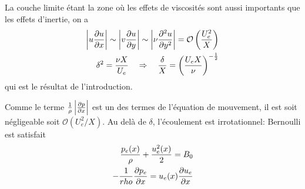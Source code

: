      La couche limite étant la zone où les effets de viscosités sont aussi importants que les effets d'inertie, on a
      \begin{equation}
        \begin{aligned}
          \left|u\pdv{u}{x}\right| \sim \left|v \pdv{u}{y} \right| \sim \left|\nu \pdv[2]{u}{y} \right| = \mathcal{O}\left(\frac{U_e^2}{X}\right)\\
          \delta^2 = \frac{\nu X}{U_e} \quad \Rightarrow \quad \frac{\delta}{X} = \left(\frac{U_e X}{\nu}\right)^{-\frac{1}{2}}
        \end{aligned}
      \end{equation}
      qui est le résultat de l'introduction.

      Comme le terme $\frac{1}{\rho} \left|\pdv{p}{x}\right|$ est un des termes de l'équation de mouvement, il est soit négligeable soit $\mathcal{O}(U_e^2/X)$. Au delà de $\delta$, l'écoulement est irrotationnel: Bernoulli est satisfait
      \begin{equation}
        \begin{aligned}
          \frac{p_e(x)}{\rho} + \frac{u_e^2(x)}{2} = B_0\\
          -\frac{1}{rho} \pdv{p_e}{x}(x) = u_e(x) \pdv{u_e}{x}(x)
        \end{aligned}
      \end{equation}

